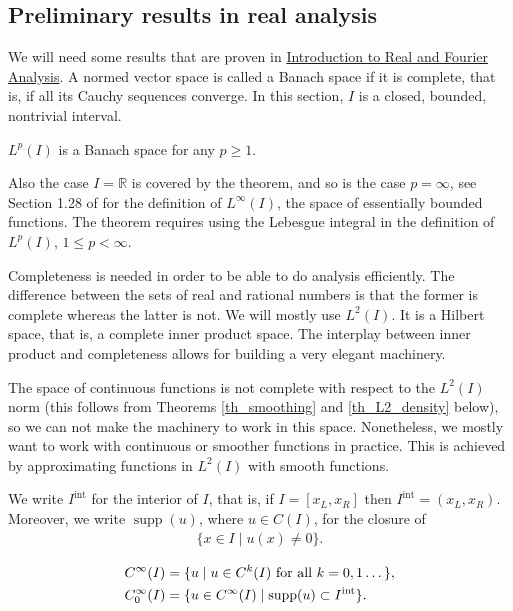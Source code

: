 \documentclass[12pt,oneside]{amsart}
\def\R{\mathbb R}
\DeclareMathOperator{\supp}{supp}
\def\inter{\mathrm{int}}
\begin{document}
\subsection{Preliminary results in real analysis}

We will need some results that are proven in \href{https://studies.helsinki.fi/opintotarjonta/cu/hy-CU-133769219-2020-08-01}{Introduction to Real and Fourier Analysis}.
A normed vector space is called a Banach space if it is complete, that is, if all its Cauchy sequences converge. In this section, $I$ is a closed, bounded, nontrivial interval.

\begin{theorem}
$L^p(I)$ is a Banach space for any $p \ge 1$.
\end{theorem}

Also the case $I = \R$ is covered by the theorem, and so is the case $p = \infty$, see Section 1.28 of \cite{Holopainen} for the definition of $L^\infty(I)$, the space of essentially bounded functions. The theorem requires using the Lebesgue integral in the definition of $L^p(I)$, $1 \le p < \infty$. 

Completeness is needed in order to be able to do analysis efficiently. The difference between the sets of real and rational numbers is that the former is complete whereas the latter is not. 
We will mostly use $L^2(I)$. It is a Hilbert space, that is, a complete inner product space. The interplay between inner product and completeness allows for building a very elegant machinery. 

The space of continuous functions is not complete with respect to the $L^2(I)$ norm (this follows from Theorems \ref{th_smoothing} and \ref{th_L2_density} below), so we can not make the machinery to work in this space. Nonetheless, we mostly want to work with continuous or smoother functions in practice. This is achieved by approximating functions in $L^2(I)$ with smooth functions. 

We write $I^\inter$ for the interior of $I$, that is, 
if $I = [x_L, x_R]$ then $I^\inter = (x_L, x_R)$. 
Moreover, we write $\supp(u)$, where $u \in C(I)$, for the closure of 
    \begin{align*}
\{x \in I \mid u(x) \ne 0\}.
    \end{align*}


\begin{definition}
    \begin{align*}
C^\infty(I) &= 
\{ u \mid 
\textnormal{$u \in C^k(I)$ for all $k=0,1\dots$} \},
\\
C_0^\infty(I) &= 
\{ u \in C^\infty(I) \mid 
\textnormal{$\supp(u) \subset I^\inter$}\}.
    \end{align*}
\end{definition}
\end{document}
